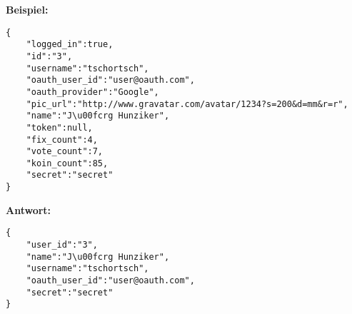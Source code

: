 \textbf{Beispiel:}

\lstset{language=JavaScript}
\begin{lstlisting}[style=examples]
{
	"logged_in":true,
	"id":"3",
	"username":"tschortsch",
	"oauth_user_id":"user@oauth.com",
	"oauth_provider":"Google",
	"pic_url":"http://www.gravatar.com/avatar/1234?s=200&d=mm&r=r",
	"name":"J\u00fcrg Hunziker",
	"token":null,
	"fix_count":4,
	"vote_count":7,
	"koin_count":85,
	"secret":"secret"
}
\end{lstlisting}

\textbf{Antwort:}
\lstset{language=JavaScript}
\begin{lstlisting}[style=examples]
{
	"user_id":"3",
	"name":"J\u00fcrg Hunziker",
	"username":"tschortsch",
	"oauth_user_id":"user@oauth.com",
	"secret":"secret"
}
\end{lstlisting}